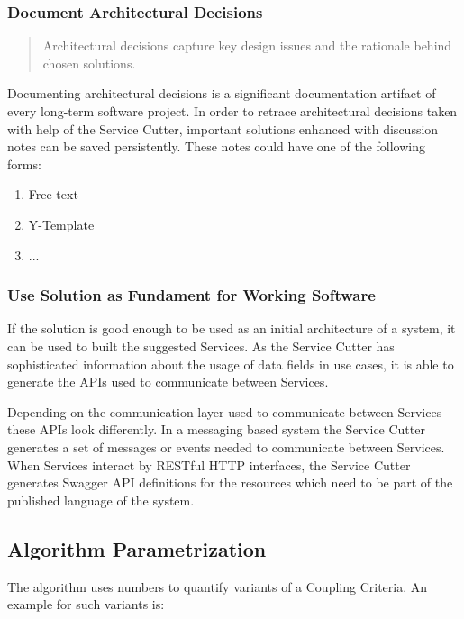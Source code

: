 \subsubsection{Document Architectural Decisions}

\begin{quote}
	Architectural decisions capture key design issues and the rationale behind chosen solutions.\cite{zioAD}
\end{quote}

Documenting architectural decisions is a significant documentation artifact of every long-term software project. In order to retrace architectural decisions taken with help of the Service Cutter, important solutions enhanced with discussion notes can be saved persistently. These notes could have one of the following forms:

\begin{enumerate}
	\item Free text
	\item Y-Template\cite{y-template}
	\item ...
\end{enumerate}

\subsubsection{Use Solution as Fundament for Working Software}

If the solution is good enough to be used as an initial architecture of a system, it can be used to built the suggested Services. As the Service Cutter has sophisticated information about the usage of data fields in use cases, it is able to generate the APIs used to communicate between Services. 

Depending on the communication layer used to communicate between Services these APIs look differently. In a messaging based system the Service Cutter generates a set of messages or events needed to communicate between Services. When Services interact by RESTful HTTP interfaces, the Service Cutter generates Swagger\cite{swagger} API definitions for the resources which need to be part of the published language\cite[p.375]{evans2003domain} of the system. 


\subsection{Algorithm Parametrization}

The algorithm uses numbers to quantify variants of a Coupling Criteria. An example for such variants is:

